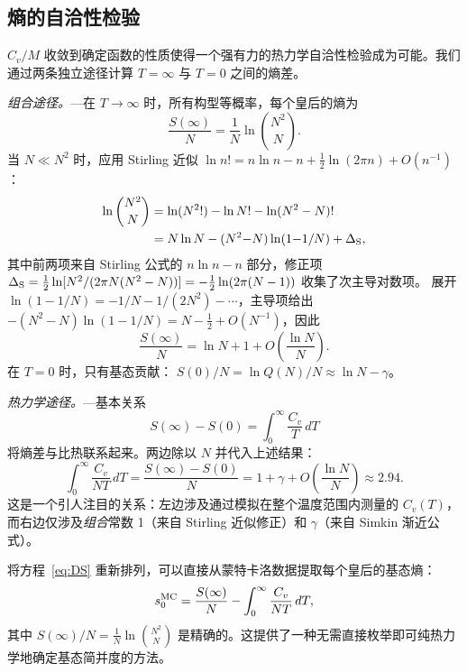 \documentclass[aps, pre, reprint, amsmath, amssymb, superscriptaddress, floatfix]{revtex4-2}
\begin{document}
\subsection{熵的自洽性检验}
\label{sec:entropy_check}

$C_v/M$ 收敛到确定函数的性质使得一个强有力的热力学自洽性检验成为可能。我们通过两条独立途径计算 $T = \infty$ 与 $T = 0$ 之间的熵差。

\textit{组合途径。}---在 $T \to \infty$ 时，所有构型等概率，每个皇后的熵为
\begin{equation}
  \frac{S(\infty)}{N}
  = \frac{1}{N}\ln\binom{N^2}{N}.
  \label{eq:Sinf_def}
\end{equation}
当 $N \ll N^2$ 时，应用 Stirling 近似
$\ln n! = n\ln n - n + \tfrac{1}{2}\ln(2\pi n) + O(n^{-1})$：
\begin{align}
  \ln\binom{N^2}{N}
  &= \ln(N^2!) - \ln N! - \ln(N^2 - N)! \notag\\
  &= N\ln N - (N^2{-}N)\ln(1{-}1/N)
  + \Delta_{\rm S},
  \label{eq:Sinf_stirling}
\end{align}
其中前两项来自 Stirling 公式的 $n\ln n - n$ 部分，修正项
$\Delta_{\rm S} = \tfrac{1}{2}\ln[N^2/(2\pi N(N^2-N))]
= -\tfrac{1}{2}\ln(2\pi(N-1))$ 收集了次主导对数项。
展开 $\ln(1 - 1/N) = -1/N - 1/(2N^2) - \cdots$，主导项给出 $-(N^2-N)\ln(1-1/N) = N - \tfrac{1}{2} + O(N^{-1})$，因此
\begin{equation}
  \frac{S(\infty)}{N}
  = \ln N + 1 + O\!\left(\frac{\ln N}{N}\right).
  \label{eq:Sinf}
\end{equation}
在 $T = 0$ 时，只有基态贡献：
$S(0)/N = \ln Q(N)/N \approx \ln N - \gamma$。

\textit{热力学途径。}---基本关系
\begin{equation}
  S(\infty) - S(0) = \int_0^\infty \frac{C_v}{T}\,dT
  \label{eq:thermo_int}
\end{equation}
将熵差与比热联系起来。两边除以 $N$ 并代入上述结果：
\begin{equation}
  \int_0^\infty \frac{C_v}{NT}\,dT
  = \frac{S(\infty) - S(0)}{N}
  = 1 + \gamma + O\!\left(\frac{\ln N}{N}\right)
  \approx 2.94.
  \label{eq:DS}
\end{equation}
这是一个引人注目的关系：左边涉及通过模拟在整个温度范围内测量的 $C_v(T)$，而右边仅涉及\emph{组合}常数 1（来自 Stirling 近似修正）和 $\gamma$（来自 Simkin 渐近公式）。

将方程~\eqref{eq:DS} 重新排列，可以直接从蒙特卡洛数据提取每个皇后的基态熵：
\begin{equation}
  s_0^{\rm MC}
  = \frac{S(\infty)}{N} - \int_0^\infty \frac{C_v}{NT}\,dT,
  \label{eq:s0_MC}
\end{equation}
其中 $S(\infty)/N = \frac{1}{N}\ln\binom{N^2}{N}$ 是精确的。这提供了一种无需直接枚举即可纯热力学地确定基态简并度的方法。
\end{document}
